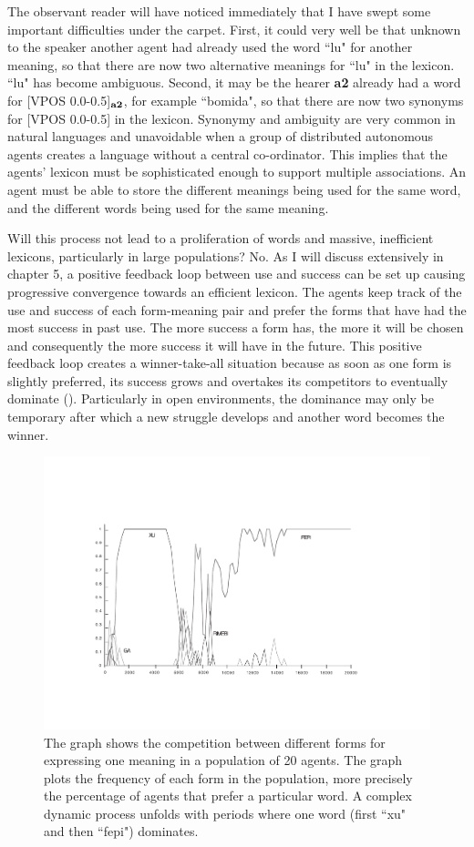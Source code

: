 The observant reader will have noticed immediately that 
I have swept some important difficulties under the carpet. 
First, it could very well be that unknown to the speaker 
another agent had already used the word ``lu" 
for another meaning, so that there are now 
two alternative meanings for ``lu" in the lexicon. ``lu" 
has become ambiguous. Second, it may be the hearer {\bf a2} already 
had a word for [VPOS 0.0-0.5]$_{\bf a2}$, for example ``bomida", 
so that there are now two synonyms for [VPOS 0.0-0.5] in the lexicon. 
Synonymy and ambiguity are very common in 
natural languages and unavoidable when a group of 
distributed autonomous agents creates a language without
a central co-ordinator. This implies that 
the agents' lexicon must be sophisticated enough 
to support multiple associations. An agent must be able to 
store the different meanings being used for the same word, and the 
different words being used for the same meaning. 

Will this process not lead to a proliferation of words and 
massive, inefficient lexicons, particularly in large
populations? No. As I will discuss extensively 
in chapter 5, a positive feedback 
loop between use and success
can be set up causing progressive convergence towards an 
efficient lexicon. The agents keep track of the use and 
success of each form-meaning pair and prefer the forms that have had
the most success in past use. The more success a form has, the more
it will be chosen 
and consequently the more success it will have in the 
future. This positive feedback loop creates a winner-take-all 
situation because as soon as one form is slightly preferred, 
its success grows and overtakes its competitors
to eventually dominate (). Particularly 
in open environments, the dominance may only be temporary 
after which a new struggle develops and another word 
becomes the winner. 
\begin{figure}[htbp]
  \centerline{\includegraphics[width=.80\textwidth]{chap2/figs/competition-1}}
\caption{\label{competition1} 
The graph shows the competition between different forms for
expressing one meaning in a population of 20 agents. The graph plots 
the frequency of each form in the population, more precisely the percentage
of agents that prefer a particular word. A complex dynamic
process unfolds with periods where one word (first ``xu" and then ``fepi") dominates.} 
\end{figure}

